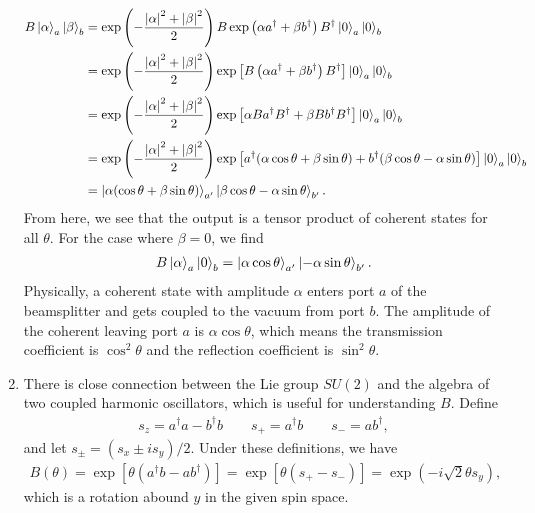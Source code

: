 \documentclass{article}
\theoremstyle{definition}
\newcommand{\al}{\alpha}
\newcommand{\be}{\beta}
\newcommand{\f}[2]{\frac{#1}{#2}}
\newcommand{\lp}{\left(}
\newcommand{\rp}{\right)}
\newcommand{\lb}{\left[}
\newcommand{\rb}{\right]}
\begin{document}
\begin{enumerate}[label=\alph*)]
\begin{align*}
B \ket{\al}_a \ket{\be}_b
&= \exp\lp -\f{\abs{\al}^2 + \abs{\be}^2}{2} \rp B \exp\lp \al a^\dagger + \be b^\dagger \rp B^\dagger \ket{0}_a \ket{0}_b \\
&= \exp\lp -\f{\abs{\al}^2 + \abs{\be}^2}{2} \rp \exp\lb B \lp \al a^\dagger + \be b^\dagger \rp B^\dagger \rb  \ket{0}_a \ket{0}_b \\
&= \exp\lp -\f{\abs{\al}^2 + \abs{\be}^2}{2} \rp  \exp\lb \al Ba^\dagger B^\dagger  + \be B b^\dagger B^\dagger \rb \ket{0}_a \ket{0}_b \\
&= \exp\lp -\f{\abs{\al}^2 + \abs{\be}^2}{2} \rp 
\exp\lb a^\dagger(\al\cos\theta + \be\sin\theta) + b^\dagger (\be \cos\theta - \al\sin\theta) \rb \ket{0}_a \ket{0}_b \\
&= \ket{\al(\cos\theta + \be\sin\theta)}_{a'} \ket{ \be\cos\theta -\al\sin\theta }_{b'}.
\end{align*}
From here, we see that the output is a tensor product of coherent states for all $\theta$. For the case where $\be  =0$, we find 
\begin{align*}
B\ket{\al}_a \ket{0}_b = \ket{\al\cos\theta}_{a'} \ket{-\al\sin\theta }_{b'}.
\end{align*}
Physically, a coherent state with amplitude $\al$ enters port $a$ of the beamsplitter and gets coupled to the vacuum from port $b$. The amplitude of the coherent leaving port $a$ is $\al\cos\theta$, which means the transmission coefficient is $\cos^2\theta$ and the reflection coefficient is $\sin^2\theta$.

\item There is close connection between the Lie group $SU(2)$ and the algebra of two coupled harmonic oscillators, which is useful for understanding $B$. Define
\begin{align*}
s_z = a^\dagger a - b^\dagger b \quad\quad s_+ = a^\dagger b \quad\quad s_- = a b^\dagger, 
\end{align*}
and let $s_\pm = (s_x \pm i s_y)/2$. Under these definitions, we have
\begin{align*}
B(\theta) = \exp\lb \theta\lp a^\dagger b - ab^\dagger \rp \rb = \exp\lb \theta(s_+ - s_-) \rb = \exp(-i \sqrt{2} \theta s_y),
\end{align*}
which is a rotation abound $y$ in the given spin space. \\


\end{enumerate}
\end{document}
